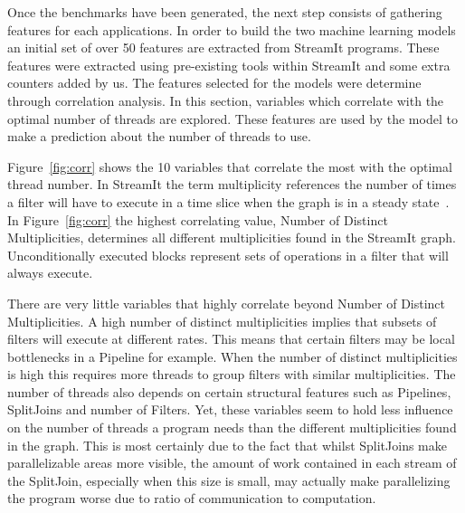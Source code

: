 Once the benchmarks have been generated, the next step consists of gathering features for each applications.
In order to build the two machine learning models an initial set of over 50 features are extracted from StreamIt programs.
These features were extracted using pre-existing tools within StreamIt and some extra counters added by us.
The features selected for the models were determine through correlation analysis.
In this section, variables which correlate with the optimal number of threads are explored.
These features are used by the model to make a prediction about the number of threads to use.

Figure~\ref{fig:corr} shows the 10 variables that correlate the most with the optimal thread number.
In StreamIt the term multiplicity references the number of times a filter will have to execute in a time slice when the graph is in a steady state~\cite{gordon2002streamcomp}.
In Figure~\ref{fig:corr} the highest correlating value, Number of Distinct Multiplicities, determines all different multiplicities found in the StreamIt graph.
Unconditionally executed blocks represent sets of operations in a filter that will always execute.

There are very little variables that highly correlate beyond Number of Distinct Multiplicities.
A high number of distinct multiplicities implies that subsets of filters will execute at different rates.
This means that certain filters may be local bottlenecks in a Pipeline for example.
When the number of distinct multiplicities is high this requires more threads to group filters with similar multiplicities.
The number of threads also depends on certain structural features such as Pipelines, SplitJoins and number of Filters.
Yet, these variables seem to hold less influence on the number of threads a program needs than the different multiplicities found in the graph.
This is most certainly due to the fact that whilst SplitJoins make parallelizable areas more visible, the amount of work contained in each stream of the SplitJoin, especially when this size is small, may actually make parallelizing the program worse due to ratio of communication to computation.

